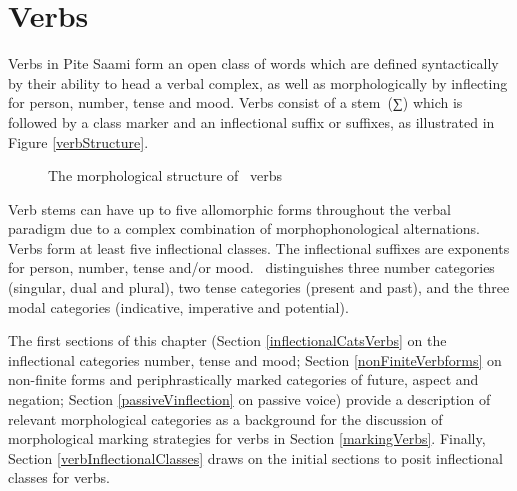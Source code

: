 

\chapter{Verbs}\label{verbs}
Verbs in Pite Saami form an open class of words which are defined syntactically by their ability to head a verbal complex, as well as morphologically by inflecting for person, number, tense and mood. 
Verbs consist of a \mbox{stem (∑)} which is followed by a class marker and an inflectional suffix or suffixes, %
as illustrated in Figure \vref{verbStructure}.

\begin{figure}\centering
{}
\caption{The morphological structure of \PS\ verbs}\label{verbStructure}
\end{figure}

Verb stems can have up to five allomorphic forms throughout the verbal para\-digm due to a complex combination of morphophonological alternations. 
Verbs form at least five inflectional classes. 
The inflectional suffixes are exponents for person, number, tense and/or mood. 
\PS\ distinguishes three number categories (singular, dual and plural), two tense categories (present and past), and the three modal categories (indicative, imperative and potential). 


The first sections of this chapter (Section \ref{inflectionalCatsVerbs} on the inflectional categories number, tense and mood; Section \ref{nonFiniteVerbforms} on non-finite forms and periphrastically marked categories of future, aspect and negation; Section \ref{passiveVinflection} on passive voice) provide a description of relevant morphological categories as a background for the discussion of morphological marking strategies for verbs in Section \ref{markingVerbs}. Finally, Section \ref{verbInflectionalClasses} draws on the initial sections to posit inflectional classes for verbs. 


